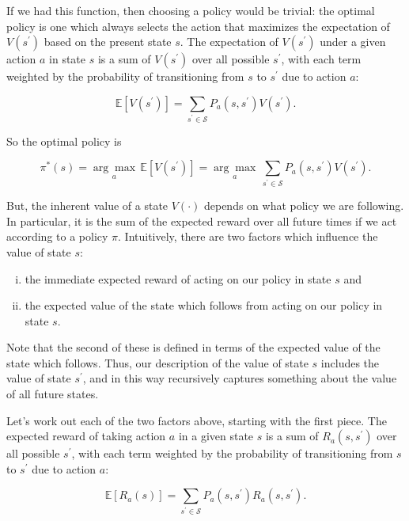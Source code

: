 \documentclass[12pt]{article}
\begin{document}
If we had this function, then choosing a policy would be trivial: the optimal policy is one which always selects the action that maximizes the expectation of $V(s^\prime)$ based on the present state $s$. The expectation of $V(s^\prime)$ under a given action $a$ in state $s$ is a sum of $V(s^\prime)$ over all possible $s^\prime$, with each term weighted by the probability of transitioning from $s$ to $s^\prime$ due to action $a$:

\begin{equation}
\mathbb{E}[V(s^\prime)] = \sum_{s^\prime \in \mathscr{S}} P_a(s, s^\prime) V(s^\prime).
\end{equation}

So the optimal policy is

\begin{equation}
\pi^*(s) = \underset{a}{\arg\max} \, \mathbb{E}[V(s^\prime)] = \underset{a}{\arg\max} \, \sum_{s^\prime \in \mathscr{S}} P_a(s, s^\prime) V(s^\prime).
\end{equation}

But, the inherent value of a state $V(\cdot)$ depends on what policy we are following. In particular, it is the sum of the expected reward over all future times if we act according to a policy $\pi$. Intuitively, there are two factors which influence the value of state $s$:

\begin{enumerate}[(i)]
\item{the immediate expected reward of acting on our policy in state $s$} and
\item{the expected value of the state which follows from acting on our policy in state $s$.}
\end{enumerate}

Note that the second of these is defined in terms of the expected value of the state which follows. Thus, our description of the value of state $s$ includes the value of state $s^\prime$, and in this way recursively captures something about the value of all future states.

Let's work out each of the two factors above, starting with the first piece. The expected reward of taking action $a$ in a given state $s$ is a sum of $R_a(s, s^\prime)$ over all possible $s^\prime$, with each term weighted by the probability of transitioning from $s$ to $s^\prime$ due to action $a$:

\begin{equation}
\mathbb{E}[R_a(s)] = \sum_{s^\prime \in \mathscr{S}} P_a(s, s^\prime) R_a(s, s^\prime).
\end{equation}
\end{document}
